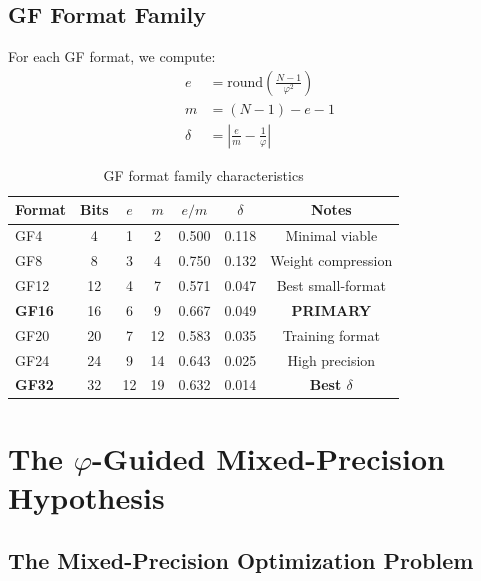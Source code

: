 \documentclass{article}
\begin{document}
\subsection{GF Format Family}

For each GF format, we compute:
\begin{align}
e &= \text{round}\left(\frac{N-1}{\varphi^2}\right) \\
m &= (N-1) - e - 1 \\
\delta &= \left|\frac{e}{m} - \frac{1}{\varphi}\right|
\end{align}

\begin{table}[h]
\centering
\begin{tabular}{lcccccc}
\toprule
Format & Bits & $e$ & $m$ & $e/m$ & $\delta$ & Notes \\
\midrule
GF4    & 4     & 1   & 2    & 0.500 & 0.118 & Minimal viable \\
GF8    & 8     & 3   & 4    & 0.750 & 0.132 & Weight compression \\
GF12   & 12    & 4   & 7    & 0.571 & 0.047 & Best small-format \\
\textbf{GF16} & 16  & 6   & 9    & 0.667 & 0.049 & \textbf{PRIMARY} \\
GF20   & 20    & 7   & 12   & 0.583 & 0.035 & Training format \\
GF24   & 24    & 9   & 14   & 0.643 & 0.025 & High precision \\
\textbf{GF32} & 32    & 12  & 19   & 0.632 & 0.014 & \textbf{Best $\delta$} \\
\bottomrule
\end{tabular}
\caption{GF format family characteristics}
\end{table}


\section{The $\varphi$-Guided Mixed-Precision Hypothesis}

\subsection{The Mixed-Precision Optimization Problem}
\end{document}
